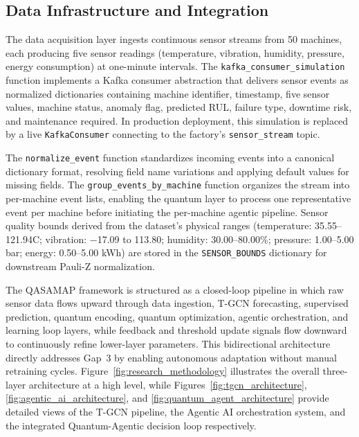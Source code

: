 \subsection{Data Infrastructure and Integration}

The data acquisition layer ingests continuous sensor streams from 50 machines, each producing five sensor readings (temperature, vibration, humidity, pressure, energy consumption) at one-minute intervals. The \texttt{kafka\_consumer\_simulation} function implements a Kafka consumer abstraction that delivers sensor events as normalized dictionaries containing machine identifier, timestamp, five sensor values, machine status, anomaly flag, predicted RUL, failure type, downtime risk, and maintenance required. In production deployment, this simulation is replaced by a live \texttt{KafkaConsumer} connecting to the factory's \texttt{sensor\_stream} topic.

The \texttt{normalize\_event} function standardizes incoming events into a canonical dictionary format, resolving field name variations and applying default values for missing fields. The \texttt{group\_events\_by\_machine} function organizes the stream into per-machine event lists, enabling the quantum layer to process one representative event per machine before initiating the per-machine agentic pipeline. Sensor quality bounds derived from the dataset's physical ranges (temperature: 35.55--121.94\textdegree C; vibration: $-$17.09 to 113.80; humidity: 30.00--80.00\%; pressure: 1.00--5.00 bar; energy: 0.50--5.00 kWh) are stored in the \texttt{SENSOR\_BOUNDS} dictionary for downstream Pauli-Z normalization.

The QASAMAP framework is structured as a closed-loop pipeline in which raw sensor data flows upward through data ingestion, T-GCN forecasting, supervised prediction, quantum encoding, quantum optimization, agentic orchestration, and learning loop layers, while feedback and threshold update signals flow downward to continuously refine lower-layer parameters. This bidirectional architecture directly addresses Gap~3 by enabling autonomous adaptation without manual retraining cycles. Figure~\ref{fig:research_methodology} illustrates the overall three-layer architecture at a high level, while Figures~\ref{fig:tgcn_architecture}, \ref{fig:agentic_ai_architecture}, and \ref{fig:quantum_agent_architecture} provide detailed views of the T-GCN pipeline, the Agentic AI orchestration system, and the integrated Quantum-Agentic decision loop respectively.


